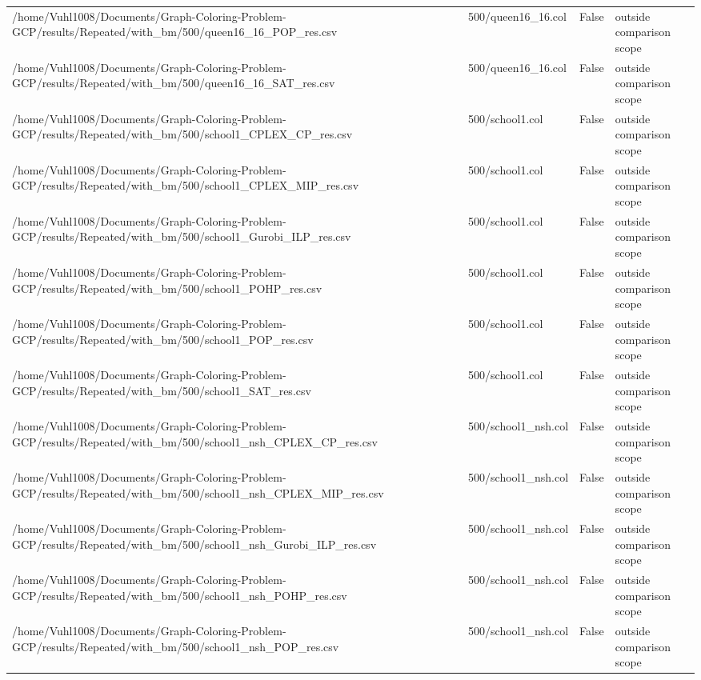 \begin{table}[htbp]
\begin{tabular}{llll}
/home/Vuhl1008/Documents/Graph-Coloring-Problem-GCP/results/Repeated/with\_bm/500/queen16\_16\_POP\_res.csv & 500/queen16\_16.col & False & outside comparison scope \\
/home/Vuhl1008/Documents/Graph-Coloring-Problem-GCP/results/Repeated/with\_bm/500/queen16\_16\_SAT\_res.csv & 500/queen16\_16.col & False & outside comparison scope \\
/home/Vuhl1008/Documents/Graph-Coloring-Problem-GCP/results/Repeated/with\_bm/500/school1\_CPLEX\_CP\_res.csv & 500/school1.col & False & outside comparison scope \\
/home/Vuhl1008/Documents/Graph-Coloring-Problem-GCP/results/Repeated/with\_bm/500/school1\_CPLEX\_MIP\_res.csv & 500/school1.col & False & outside comparison scope \\
/home/Vuhl1008/Documents/Graph-Coloring-Problem-GCP/results/Repeated/with\_bm/500/school1\_Gurobi\_ILP\_res.csv & 500/school1.col & False & outside comparison scope \\
/home/Vuhl1008/Documents/Graph-Coloring-Problem-GCP/results/Repeated/with\_bm/500/school1\_POHP\_res.csv & 500/school1.col & False & outside comparison scope \\
/home/Vuhl1008/Documents/Graph-Coloring-Problem-GCP/results/Repeated/with\_bm/500/school1\_POP\_res.csv & 500/school1.col & False & outside comparison scope \\
/home/Vuhl1008/Documents/Graph-Coloring-Problem-GCP/results/Repeated/with\_bm/500/school1\_SAT\_res.csv & 500/school1.col & False & outside comparison scope \\
/home/Vuhl1008/Documents/Graph-Coloring-Problem-GCP/results/Repeated/with\_bm/500/school1\_nsh\_CPLEX\_CP\_res.csv & 500/school1\_nsh.col & False & outside comparison scope \\
/home/Vuhl1008/Documents/Graph-Coloring-Problem-GCP/results/Repeated/with\_bm/500/school1\_nsh\_CPLEX\_MIP\_res.csv & 500/school1\_nsh.col & False & outside comparison scope \\
/home/Vuhl1008/Documents/Graph-Coloring-Problem-GCP/results/Repeated/with\_bm/500/school1\_nsh\_Gurobi\_ILP\_res.csv & 500/school1\_nsh.col & False & outside comparison scope \\
/home/Vuhl1008/Documents/Graph-Coloring-Problem-GCP/results/Repeated/with\_bm/500/school1\_nsh\_POHP\_res.csv & 500/school1\_nsh.col & False & outside comparison scope \\
/home/Vuhl1008/Documents/Graph-Coloring-Problem-GCP/results/Repeated/with\_bm/500/school1\_nsh\_POP\_res.csv & 500/school1\_nsh.col & False & outside comparison scope \\

\end{tabular}
\end{table}
